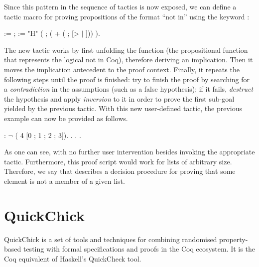 Since this pattern in the sequence of tactics is now exposed, we can define a tactic macro for proving propositions of the format ``not in'' using the keyword :

\begin{coqdoccode}
	\coqdocnoindent
	  :=  ;\coqdoceol
	\coqdocindent{1.00em}
	  :=  "H"  (\coqdoceol
	\coqdocindent{2.00em}
	 ;  ( + ( ; [>   \ensuremath{|} ]))\coqdoceol
	\coqdocindent{1.00em}
	).\coqdoceol
\end{coqdoccode}

The new tactic  works by first unfolding the function  (the propositional function that represents the logical not in Coq), therefore deriving an implication. Then it moves the implication antecedent to the proof context. Finally, it repeats the following steps until the proof is finished: try to finish the proof by searching for a \emph{contradiction} in the assumptions (such as a false hypothesis); if it fails, \emph{destruct} the hypothesis and apply \emph{inversion} to it in order to prove the first sub-goal yielded by the previous tactic. With this new user-defined tactic, the previous example can now be provided as follows.

\begin{coqdoccode}
	\coqdocemptyline
	\coqdocnoindent
	  : \ensuremath{\lnot} ( 4 [0 ; 1 ; 2 ; 3]).\coqdoceol
	\coqdocnoindent
	. . .\coqdoceol
\end{coqdoccode}

As one can see, with no further user intervention besides invoking the appropriate tactic. Furthermore, this proof script would work for lists of arbitrary size. Therefore, we say that  describes a decision procedure for proving that some element is not a member of a given list.

\section{QuickChick}
\label{section:quickchick}

QuickChick is a set of tools and techniques for combining randomised property-based testing with formal specifications and proofs in the Coq ecosystem. It is the Coq equivalent of Haskell's QuickCheck tool.

